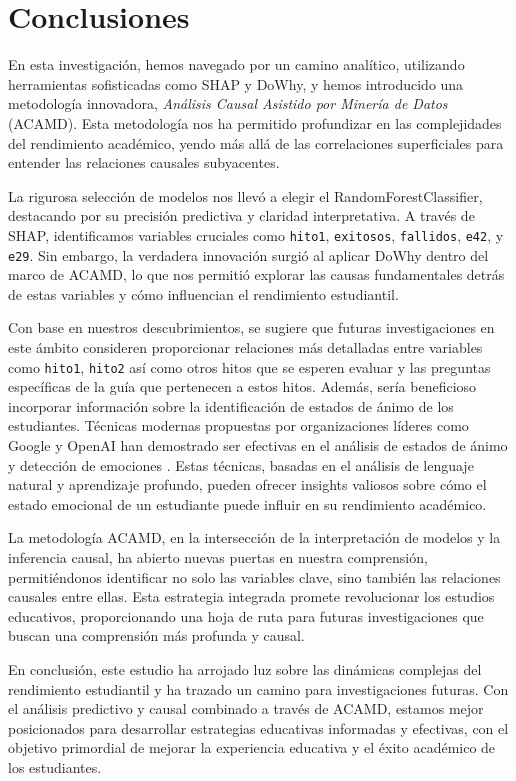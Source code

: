 \hypertarget{Conclusiones}{%
    \section{Conclusiones}\label{Conclusiones}}

En esta investigación, hemos navegado por un camino analítico, utilizando herramientas sofisticadas como SHAP y DoWhy, y hemos introducido una metodología innovadora, \textit{Análisis Causal Asistido por Minería de Datos} (ACAMD). Esta metodología nos ha permitido profundizar en las complejidades del rendimiento académico, yendo más allá de las correlaciones superficiales para entender las relaciones causales subyacentes.

La rigurosa selección de modelos nos llevó a elegir el RandomForestClassifier, destacando por su precisión predictiva y claridad interpretativa. A través de SHAP, identificamos variables cruciales como \texttt{hito1}, \texttt{exitosos}, \texttt{fallidos}, \texttt{e42}, y \texttt{e29}. Sin embargo, la verdadera innovación surgió al aplicar DoWhy dentro del marco de ACAMD, lo que nos permitió explorar las causas fundamentales detrás de estas variables y cómo influencian el rendimiento estudiantil.

Con base en nuestros descubrimientos, se sugiere que futuras investigaciones en este ámbito consideren proporcionar relaciones más detalladas entre variables como \texttt{hito1}, \texttt{hito2} así como otros hitos que se esperen evaluar y las preguntas específicas de la guía que pertenecen a estos hitos. Además, sería beneficioso incorporar información sobre la identificación de estados de ánimo de los estudiantes. Técnicas modernas propuestas por organizaciones líderes como Google y OpenAI han demostrado ser efectivas en el análisis de estados de ánimo y detección de emociones \cite{google_mood_tracking_2022, google_sentiment_api_2022, openai_sentiment_neuron_2022, openai_sentiment_analysis_2022, openai_gpt_emotion_2022, openai_chatgpt_emotion_2023}. Estas técnicas, basadas en el análisis de lenguaje natural y aprendizaje profundo, pueden ofrecer insights valiosos sobre cómo el estado emocional de un estudiante puede influir en su rendimiento académico.

La metodología ACAMD, en la intersección de la interpretación de modelos y la inferencia causal, ha abierto nuevas puertas en nuestra comprensión, permitiéndonos identificar no solo las variables clave, sino también las relaciones causales entre ellas. Esta estrategia integrada promete revolucionar los estudios educativos, proporcionando una hoja de ruta para futuras investigaciones que buscan una comprensión más profunda y causal.

En conclusión, este estudio ha arrojado luz sobre las dinámicas complejas del rendimiento estudiantil y ha trazado un camino para investigaciones futuras. Con el análisis predictivo y causal combinado a través de ACAMD, estamos mejor posicionados para desarrollar estrategias educativas informadas y efectivas, con el objetivo primordial de mejorar la experiencia educativa y el éxito académico de los estudiantes.

